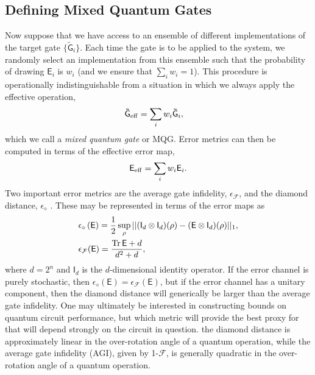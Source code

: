 \documentclass[aps,nofootinbib,pra,notitlepage,twocolumn]{revtex4-1}
\newcommand{\tr}{{\rm Tr\thinspace}}
\newcommand{\error}{\ensuremath{{\mathsf{E}}}}
\begin{document}
\subsection{Defining Mixed Quantum Gates}
\noindent Now suppose that we have access to an ensemble of different implementations of the target gate $\{\mathsf{\tilde G}_i\}$.
Each time the gate is to be applied to the system, we randomly select an implementation from this ensemble such that the probability of drawing $\mathsf{E}_i$ is $w_i$ (and we ensure that $\sum_i w_i=1$). This procedure is operationally indistinguishable from a situation in which we always apply the effective operation, 
\begin{align}
	\mathsf{\tilde G}_{\rm eff} &= \sum_i w_i \mathsf{\tilde G}_i,
\end{align}
which we call a \emph{mixed quantum gate} or MQG. Error metrics can then be computed in terms of the effective error map, 
\begin{equation}
	\mathsf{E}_{\rm eff} = \sum_i w_i \mathsf{E}_i.
\end{equation}
Two important error metrics are the average gate infidelity, $\epsilon_\mathcal{F}$, and the diamond distance, $\epsilon_\diamond$ \cite{}. These may be represented in terms of the error maps as
\begin{align}
	&\epsilon_\diamond \left(\mathsf{E}\right)
		= \frac{1}{2} \sup_\rho \vert \vert (\mathsf{I}_d\otimes \mathsf{I}_d)(\rho) 
										  - (\error \otimes \mathsf{I}_d)(\rho) \vert\vert_1,\\
	&\epsilon_\mathcal{F}(\mathsf{E}) = \frac{\tr{\error} + d}{d^2 + d},
\end{align}
where $d=2^n$ and $\mathsf{I}_d$ is the $d$-dimensional identity operator.  If the error channel is purely stochastic, then $\epsilon_\diamond(\error) = \epsilon_\mathcal{F}(\error)$, but if the error channel has a unitary component, then the diamond distance will generically be larger than the average gate infidelity. 
One may ultimately be interested in constructing bounds on quantum circuit performance, but which metric will provide the best proxy for that will depend strongly on the circuit in question. the diamond distance is approximately linear in the over-rotation angle of a quantum operation, while the average gate infidelity (AGI), given by 1-$\mathcal{F}$, is generally quadratic in the over-rotation angle of a quantum operation. 
\end{document}
